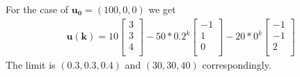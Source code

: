 \documentclass[a4paper,11pt]{article}
\newcommand{\mybf}[1]{\boldsymbol{#1}}
\begin{document}
For the case of $\mybf{u_0}=(100,0,0)$ we get
\begin{align*}
\mybf{u(k)} = 
10
\begin{bmatrix}
3 \\
3 \\
4 \\
\end{bmatrix}
-50*{0.2}^k
\begin{bmatrix}
-1 \\
1 \\
0 \\
\end{bmatrix}
-20*{0}^k
\begin{bmatrix}
-1 \\
-1 \\
2 \\
\end{bmatrix}
\end{align*}
The limit is $(0.3, 0.3, 0.4)$ and $(30,30,40)$ correspondingly.
\end{document}
